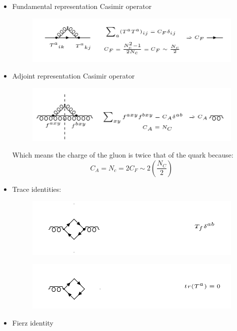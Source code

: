 \begin{itemize}
\item Fundamental representation Casimir operator\\
\begin{figure}[h!]
\centering
\includegraphics[scale=0.6]{images/Intro/Casimir1.png}
\end{figure}

\item Adjoint representation Casimir operator\\
\begin{figure}[h!]
\centering
\includegraphics[scale=0.6]{images/Intro/Casimir2.png}
\end{figure}


Which means the charge of the gluon is twice that of the quark because:
\begin{equation}
 C_A = N_c =2C_F \sim 2(\frac{N_C}{2}) 
\end{equation}
\item Trace identities:\\
\begin{figure}[h!]
\centering
\includegraphics[scale=0.6]{images/Intro/Casimir3.png}
\end{figure}
\begin{figure}[h!]
\centering
\includegraphics[scale=0.6]{images/Intro/Casimir4.png}
\end{figure}

\item Fierz identity
\end{itemize}
